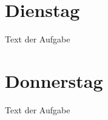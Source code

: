 \documentclass{uebung_cs}
\begin{document}
\section*{Dienstag}

\begin{aufgabe}
    Text der Aufgabe
\end{aufgabe}

\section*{Donnerstag}

\begin{aufgabe}
  Text der Aufgabe
\end{aufgabe}
\end{document}
